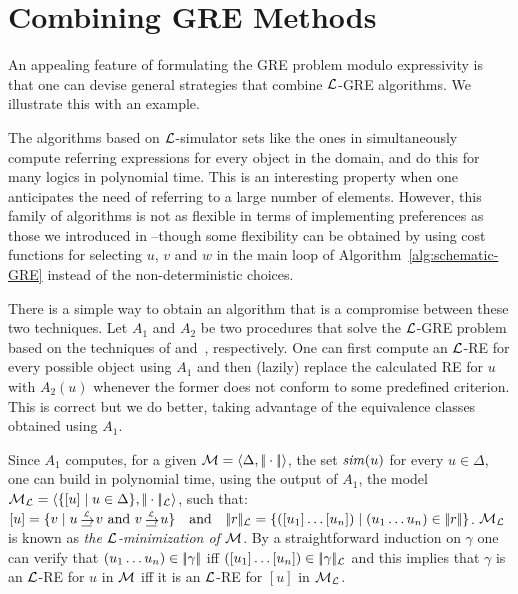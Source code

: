 \section{Combining GRE Methods}\label{sec:combining}

An appealing feature of formulating the GRE problem modulo expressivity
is that one can devise general strategies that combine $\mathcal{L}$-GRE algorithms.
We illustrate this with an example.

The algorithms based on $\mathcal{L}$-simulator sets like the ones in
 simultaneously compute referring
expressions for every object in the domain, and do this for many
logics in polynomial time. This is an interesting property when one
anticipates the need of referring to a large number of elements.
However, this family of algorithms is not as flexible in terms of
implementing preferences as those we introduced in
 --though some flexibility can be obtained
by using cost functions for selecting $u$, $v$ and $w$ in the main
loop of Algorithm~\ref{alg:schematic-GRE} instead of the
non-deterministic choices.


There is a simple way to obtain an algorithm that is a compromise
between these two techniques. Let $A_1$ and $A_2$ be two procedures
that solve the $\mathcal{L}$-GRE problem based on the techniques of
 and~, respectively.
One can first compute an $\mathcal{L}$-RE for every possible object using
$A_1$ and then (lazily) replace the calculated RE for $u$ with
$A_2(u)$ whenever the former does not conform to some predefined
criterion. This is correct but we do better, taking advantage of the
equivalence classes obtained using $A_1$.

Since $A_1$ computes, for a given $\mathcal{M} = \langle \Delta,|\!|\cdot|\!|\rangle$, the
set ${\it sim}(u)$ for every $u \in \Delta$, one can  build in polynomial time, using
the output of $A_1$, the model $\mathcal{M}_{\mathcal{L}} = \langle \{[u] \mid u \in \Delta\}, |\!|\cdot|\!|_{\mathcal{L}}\rangle$,
such that:
$[u] = \cset{v \mid u \simul{\+L} v$ and $v \simul{\+L}
u}\quad \mbox{and}\quad \interp{r}_{\+L} = \cset{([u_1]\ldots [u_n])
\mid (u_1\ldots u_n) \in \interp{r}}$.
$\mathcal{M}_{\mathcal{L}}$ is known as \emph{the $\mathcal{L}$-minimization of $\mathcal{M}$}. By a
straightforward induction on $\gamma$ one can verify that
$(u_1\ldots u_n) \in |\!|\gamma|\!|$ iff $([u_1]\dots [u_n]) \in
|\!|\gamma|\!|_{\mathcal{L}}$ and this implies that $\gamma$ is an $\mathcal{L}$-RE
for $u$ in $\mathcal{M}$ iff it is an $\mathcal{L}$-RE for $[u]$ in $\mathcal{M}_{\mathcal{L}}$.


